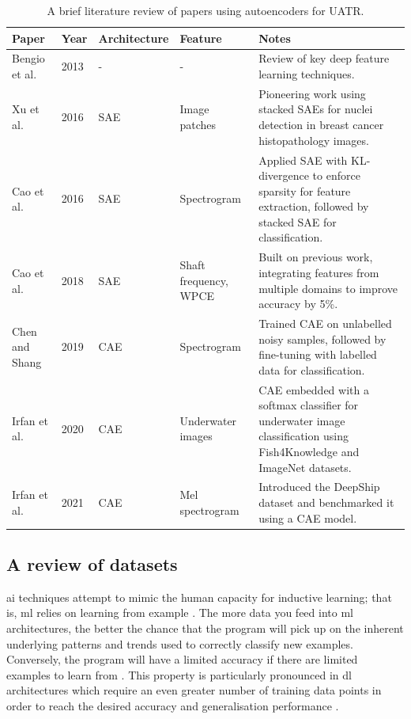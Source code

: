 \begin{table}
\centering
\caption{A brief literature review of papers using autoencoders for UATR.}
\label{tab:ae-review}
\begin{tabular}{lllp{4cm}p{10cm}}
\toprule
\textbf{Paper} & \textbf{Year} & \textbf{Architecture} & \textbf{Feature} & \textbf{Notes} \\ \midrule
Bengio et al. \cite{bengio_representation_2013} & 2013 & - & - & Review of key deep feature learning techniques. \\
Xu et al. \cite{xu_stacked_2016} & 2016 & SAE & Image patches & Pioneering work using stacked SAEs for nuclei detection in breast cancer histopathology images. \\
Cao et al. \cite{cao_deep_2016} & 2016 & SAE & Spectrogram & Applied SAE with KL-divergence to enforce sparsity for feature extraction, followed by stacked SAE for classification. \\
Cao et al. \cite{cao_convolutional_2019} & 2018 & SAE & Shaft frequency, WPCE & Built on previous work, integrating features from multiple domains to improve accuracy by 5\%. \\
Chen and Shang \cite{chenUnderwaterTargetRecognition2019} & 2019 & CAE & Spectrogram & Trained CAE on unlabelled noisy samples, followed by fine-tuning with labelled data for classification. \\
Irfan et al. \cite{irfan_novel_2021} & 2020 & CAE & Underwater images & CAE embedded with a softmax classifier for underwater image classification using Fish4Knowledge and ImageNet datasets. \\
Irfan et al. \cite{irfan_deepship_2021} & 2021 & CAE & Mel spectrogram & Introduced the DeepShip dataset and benchmarked it using a CAE model. \\ \bottomrule
\end{tabular}
\end{table}

\subsection{A review of datasets}

\acrshort{ai} techniques attempt to mimic the human capacity for inductive learning; that is, \acrlong{ml} relies on learning from example \cite{russell_inductive_1991}. The more data you feed into \acrshort{ml} architectures, the better the chance that the program will pick up on the inherent underlying patterns and trends used to correctly classify new examples. Conversely, the program will have a limited accuracy if there are limited examples to learn from \cite{neupane_review_2020}. This property is particularly pronounced in \acrlong{dl} architectures which require an even greater number of training data points in order to reach the desired accuracy and generalisation performance \cite{schmitt_there_2023}. 

